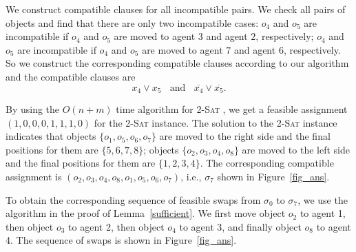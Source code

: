 \begin{example}
    We construct compatible clauses for all incompatible pairs. We check all pairs of objects and find that there
    are only two incompatible cases: $o_4$ and $o_5$ are incompatible if $o_4$ and $o_5$ are moved to agent $3$ and agent $2$, respectively; $o_4$ and $o_5$ are incompatible
    if $o_4$ and $o_5$ are moved to agent $7$ and agent $6$, respectively. So we construct the corresponding compatible clauses according to our algorithm and the compatible clauses are
    $$x_4\vee x_5 ~~~~\mbox{and}~~~~\overline{x_4}\vee\overline{x_5}.$$

    By using the $O(n+m)$ time algorithm for  \textsc{2-Sat} \citep{aspvall1982linear}, we get a feasible assignment $(1,0,0,0,1,1,1,0)$ for the \textsc{2-Sat} instance.
    The solution to the \textsc{2-Sat} instance indicates that objects $\{o_1,o_5,o_6,o_7\}$ are moved to the right side and the final positions for them are $\{5,6,7,8\}$;
    objects $\{o_2,o_3,o_4,o_8\}$ are moved to the left side and the final positions for them are $\{1,2,3,4\}$. The corresponding compatible assignment is $(o_2,o_3,o_4,o_8,o_1,o_5,o_6,o_7)$, i.e., $\sigma_7$ shown in Figure~\ref{fig_ans}.

    To obtain the corresponding sequence of feasible swaps from  $\sigma_0$ to $\sigma_7$, we use the algorithm in the proof of Lemma~\ref{sufficient}.
    We first move object $o_2$ to agent 1, then object $o_3$ to agent 2, then object $o_4$ to agent 3, and finally object $o_8$ to agent 4. The sequence of swaps is shown in Figure~\ref{fig_ans}.


    \begin{figure}[h!]
                \centering
\end{figure}
\end{example}
